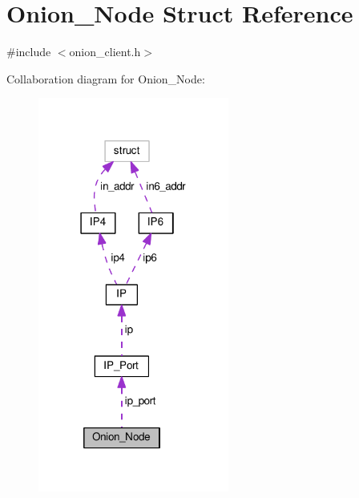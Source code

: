 \hypertarget{struct_onion___node}{\section{Onion\+\_\+\+Node Struct Reference}
\label{struct_onion___node}
}


{\ttfamily \#include $<$onion\+\_\+client.\+h$>$}



Collaboration diagram for Onion\+\_\+\+Node\+:
\nopagebreak
\begin{figure}[H]
\begin{center}
\leavevmode
\includegraphics[width=178pt]{df/df6/struct_onion___node__coll__graph}
\end{center}
\end{figure}
